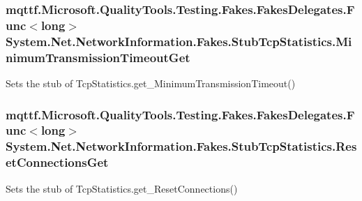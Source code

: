 \hypertarget{class_system_1_1_net_1_1_network_information_1_1_fakes_1_1_stub_tcp_statistics_aacf0cbcb11a3c3c6e4658414387459bd}{
\subsubsection[{Minimum\-Transmission\-Timeout\-Get}]{\setlength{\rightskip}{0pt plus 5cm}mqttf.\-Microsoft.\-Quality\-Tools.\-Testing.\-Fakes.\-Fakes\-Delegates.\-Func$<$long$>$ System.\-Net.\-Network\-Information.\-Fakes.\-Stub\-Tcp\-Statistics.\-Minimum\-Transmission\-Timeout\-Get}}\label{class_system_1_1_net_1_1_network_information_1_1_fakes_1_1_stub_tcp_statistics_aacf0cbcb11a3c3c6e4658414387459bd}


Sets the stub of Tcp\-Statistics.\-get\-\_\-\-Minimum\-Transmission\-Timeout()

\hypertarget{class_system_1_1_net_1_1_network_information_1_1_fakes_1_1_stub_tcp_statistics_ad61ea4633c14603e15a7d4e179ce51cf}{
\subsubsection[{Reset\-Connections\-Get}]{\setlength{\rightskip}{0pt plus 5cm}mqttf.\-Microsoft.\-Quality\-Tools.\-Testing.\-Fakes.\-Fakes\-Delegates.\-Func$<$long$>$ System.\-Net.\-Network\-Information.\-Fakes.\-Stub\-Tcp\-Statistics.\-Reset\-Connections\-Get}}\label{class_system_1_1_net_1_1_network_information_1_1_fakes_1_1_stub_tcp_statistics_ad61ea4633c14603e15a7d4e179ce51cf}


Sets the stub of Tcp\-Statistics.\-get\-\_\-\-Reset\-Connections()

